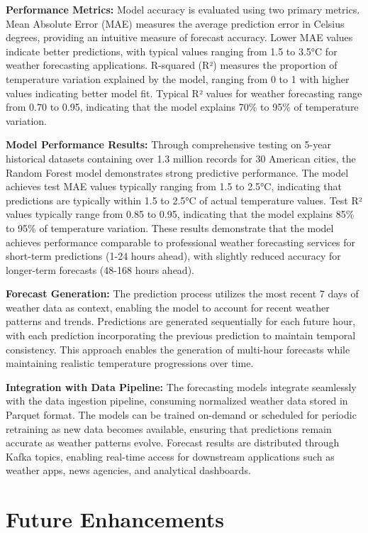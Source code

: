\documentclass[12pt,a4paper]{article}
\begin{document}
\textbf{Performance Metrics:} Model accuracy is evaluated using two primary metrics. Mean Absolute Error (MAE) measures the average prediction error in Celsius degrees, providing an intuitive measure of forecast accuracy. Lower MAE values indicate better predictions, with typical values ranging from 1.5 to 3.5°C for weather forecasting applications. R-squared (R²) measures the proportion of temperature variation explained by the model, ranging from 0 to 1 with higher values indicating better model fit. Typical R² values for weather forecasting range from 0.70 to 0.95, indicating that the model explains 70\% to 95\% of temperature variation.

\textbf{Model Performance Results:} Through comprehensive testing on 5-year historical datasets containing over 1.3 million records for 30 American cities, the Random Forest model demonstrates strong predictive performance. The model achieves test MAE values typically ranging from 1.5 to 2.5°C, indicating that predictions are typically within 1.5 to 2.5°C of actual temperature values. Test R² values typically range from 0.85 to 0.95, indicating that the model explains 85\% to 95\% of temperature variation. These results demonstrate that the model achieves performance comparable to professional weather forecasting services for short-term predictions (1-24 hours ahead), with slightly reduced accuracy for longer-term forecasts (48-168 hours ahead).

\textbf{Forecast Generation:} The prediction process utilizes the most recent 7 days of weather data as context, enabling the model to account for recent weather patterns and trends. Predictions are generated sequentially for each future hour, with each prediction incorporating the previous prediction to maintain temporal consistency. This approach enables the generation of multi-hour forecasts while maintaining realistic temperature progressions over time.

\textbf{Integration with Data Pipeline:} The forecasting models integrate seamlessly with the data ingestion pipeline, consuming normalized weather data stored in Parquet format. The models can be trained on-demand or scheduled for periodic retraining as new data becomes available, ensuring that predictions remain accurate as weather patterns evolve. Forecast results are distributed through Kafka topics, enabling real-time access for downstream applications such as weather apps, news agencies, and analytical dashboards.


\section{Future Enhancements}
\end{document}
